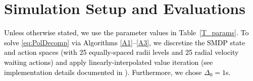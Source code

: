 \documentclass[10pt, twocolumn]{IEEEtran}
\theoremstyle{plain}
\theoremstyle{definition}
\theoremstyle{remark}
\newcommand\hlt[1]{\textcolor{black}{#1}}
\begin{document}
\vspace{-4mm}

\section{Simulation Setup and Evaluations}\label{S6}
\hlt{Unless otherwise stated, we use the parameter values in Table~\ref{T_params}. To solve \eqref{eq:PolDecomp} via Algorithms \ref{A1}--\ref{A3}, we discretize the SMDP state and action spaces (with 25 equally-spaced radii levels and 25 radial velocity waiting actions) and apply linearly-interpolated value iteration (see implementation details documented in \cite{MAESTRO-X}). %
Furthermore,  we chose $\Delta_{0}=1$s.}
\end{document}
